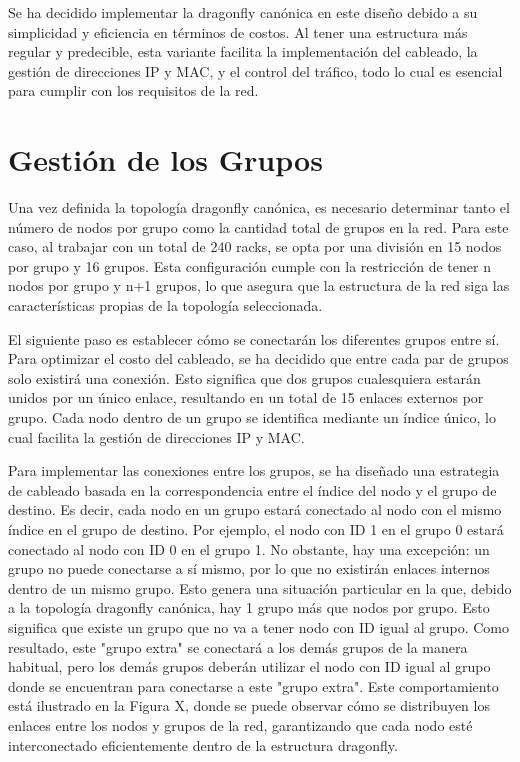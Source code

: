 \documentclass[%
    school=etsisi,%
    degree=61TI,%
]{upm-report}
\begin{document}
Se ha decidido implementar la dragonfly canónica en este diseño debido a su simplicidad y eficiencia en términos de costos. Al tener una estructura más regular y predecible, esta variante facilita la implementación del cableado, la gestión de direcciones IP y MAC, y el control del tráfico, todo lo cual es esencial para cumplir con los requisitos de la red.

\section{Gestión de los Grupos}
\label{sec:gestion-grupos}

Una vez definida la topología dragonfly canónica, es necesario determinar tanto el número de nodos por grupo como la cantidad total de grupos en la red. Para este caso, al trabajar con un total de 240 racks, se opta por una división en 15 nodos por grupo y 16 grupos. Esta configuración cumple con la restricción de tener n nodos por grupo y n+1 grupos, lo que asegura que la estructura de la red siga las características propias de la topología seleccionada.

El siguiente paso es establecer cómo se conectarán los diferentes grupos entre sí. Para optimizar el costo del cableado, se ha decidido que entre cada par de grupos solo existirá una conexión. Esto significa que dos grupos cualesquiera estarán unidos por un único enlace, resultando en un total de 15 enlaces externos por grupo. Cada nodo dentro de un grupo se identifica mediante un índice único, lo cual facilita la gestión de direcciones IP y MAC.

Para implementar las conexiones entre los grupos, se ha diseñado una estrategia de cableado basada en la correspondencia entre el índice del nodo y el grupo de destino. Es decir, cada nodo en un grupo estará conectado al nodo con el mismo índice en el grupo de destino. Por ejemplo, el nodo con ID 1 en el grupo 0 estará conectado al nodo con ID 0 en el grupo 1. No obstante, hay una excepción: un grupo no puede conectarse a sí mismo, por lo que no existirán enlaces internos dentro de un mismo grupo. Esto genera una situación particular en la que, debido a la topología dragonfly canónica, hay 1 grupo más que nodos por grupo. Esto significa que existe un grupo que no va a tener nodo con ID igual al grupo. Como resultado, este "grupo extra" se conectará a los demás grupos de la manera habitual, pero los demás grupos deberán utilizar el nodo con ID igual al grupo donde se encuentran para conectarse a este "grupo extra". Este comportamiento está ilustrado en la Figura X, donde se puede observar cómo se distribuyen los enlaces entre los nodos y grupos de la red, garantizando que cada nodo esté interconectado eficientemente dentro de la estructura dragonfly.
\end{document}
